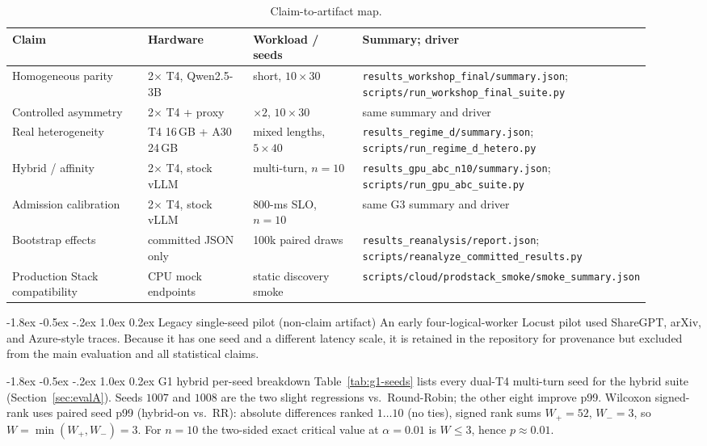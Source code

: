 \documentclass[pdflatex,sn-mathphys-num]{sn-jnl}
\makeatletter
\renewcommand{\section}{\@startsection{section}{1}{\z@}%
  {-1.8ex \@plus -0.5ex \@minus -.2ex}%
  {1.0ex \@plus 0.2ex}%
  {\needspace{4\baselineskip}\normalfont\large\bfseries}}%
\makeatother
\begin{document}
\begin{appendices}
\begin{table}[ht]
\caption{Claim-to-artifact map.}
\label{tab:artifacts}
\centering
\scriptsize
\begin{tabular}{@{}p{0.25\linewidth}p{0.19\linewidth}p{0.20\linewidth}p{0.28\linewidth}@{}}
\toprule
Claim & Hardware & Workload / seeds & Summary; driver \\
\midrule
Homogeneous parity & 2$\times$ T4, Qwen2.5-3B & short, $10\times30$ & \texttt{results\_workshop\_final/summary.json}; \texttt{scripts/run\_workshop\_final\_suite.py} \\
Controlled asymmetry & 2$\times$ T4 + proxy & $\times2$, $10\times30$ & same summary and driver \\
Real heterogeneity & T4 16\,GB + A30 24\,GB & mixed lengths, $5\times40$ & \texttt{results\_regime\_d/summary.json}; \texttt{scripts/run\_regime\_d\_hetero.py} \\
Hybrid / affinity & 2$\times$ T4, stock vLLM & multi-turn, $n{=}10$ & \texttt{results\_gpu\_abc\_n10/summary.json}; \texttt{scripts/run\_gpu\_abc\_suite.py} \\
Admission calibration & 2$\times$ T4, stock vLLM & 800-ms SLO, $n{=}10$ & same G3 summary and driver \\
Bootstrap effects & committed JSON only & 100k paired draws & \texttt{results\_reanalysis/report.json}; \texttt{scripts/reanalyze\_committed\_results.py} \\
Production Stack compatibility & CPU mock endpoints & static discovery smoke & \texttt{scripts/cloud/prodstack\_smoke/smoke\_summary.json} \\
\bottomrule
\end{tabular}
\end{table}

\section{Legacy single-seed pilot (non-claim artifact)}
\label{app:legacy}
An early four-logical-worker Locust pilot used ShareGPT, arXiv, and Azure-style
traces. Because it has one seed and a different latency scale, it is retained in
the repository for provenance but excluded from the main evaluation and all
statistical claims.

\section{G1 hybrid per-seed breakdown}
\label{app:g1-seeds}
Table~\ref{tab:g1-seeds} lists every dual-T4 multi-turn seed for the hybrid suite
(Section~\ref{sec:evalA}). Seeds $1007$ and $1008$ are the two slight regressions
vs.\ Round-Robin; the other eight improve p99. Wilcoxon signed-rank uses paired
seed p99 (hybrid-on vs.\ RR): absolute differences ranked $1{\ldots}10$ (no ties),
signed rank sums $W_+{=}52$, $W_-{=}3$, so $W{=}\min(W_+,W_-){=}3$. For $n{=}10$
the two-sided exact critical value at $\alpha{=}0.01$ is $W{\le}3$, hence
$p{\approx}0.01$.


\end{appendices}
\end{document}
